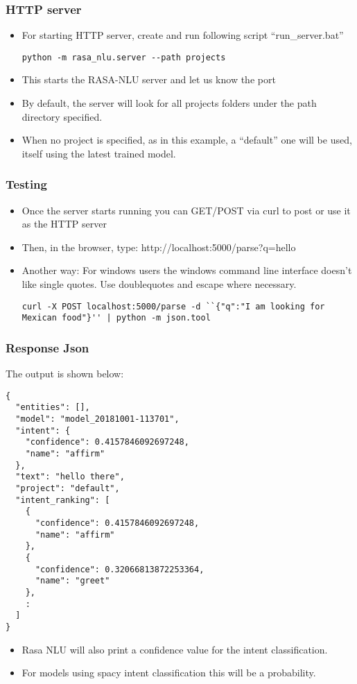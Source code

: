  \begin{frame}[fragile]\frametitle{HTTP server}
\begin{itemize}
\item For starting HTTP server, create and run following script ``run\_server.bat''
\begin{lstlisting}
python -m rasa_nlu.server --path projects
\end{lstlisting}
\item This starts the RASA-NLU server and let us know the port
\item By default, the server will look for all projects folders under the path directory specified. 
\item When no project is specified, as in this example, a ``default'' one will be used, itself using the latest trained model.
\end{itemize}
\end{frame}



 \begin{frame}[fragile]\frametitle{Testing}
\begin{itemize}
\item Once the server starts running you can GET/POST via curl to post or use it as the HTTP server
\item Then, in the browser, type: http://localhost:5000/parse?q=hello%
\item Another way: For windows users the windows command line interface doesn't like single quotes. Use doublequotes and escape where necessary.
\begin{lstlisting}
curl -X POST localhost:5000/parse -d ``{"q":"I am looking for Mexican food"}'' | python -m json.tool
\end{lstlisting}
\end{itemize}
\end{frame}

 \begin{frame}[fragile]\frametitle{Response Json}
The output is shown below:
\scriptsize
\begin{lstlisting}
{
  "entities": [],
  "model": "model_20181001-113701",
  "intent": {
    "confidence": 0.4157846092697248,
    "name": "affirm"
  },
  "text": "hello there",
  "project": "default",
  "intent_ranking": [
    {
      "confidence": 0.4157846092697248,
      "name": "affirm"
    },
    {
      "confidence": 0.32066813872253364,
      "name": "greet"
    },
    :
  ]
}
\end{lstlisting}
\begin{itemize}
\item Rasa NLU will also print a confidence value for the intent classification. 
\item For models using spacy intent classification this will be a probability.
\end{itemize}
\end{frame}

